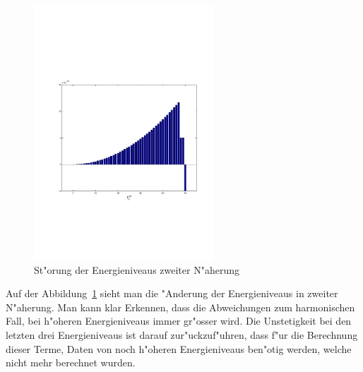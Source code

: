 \begin{refsection}
\begin{figure}	%
\centering
\includegraphics[width=0.6\textwidth]{anharmonisch/images/x3/EK2.pdf}
\caption{St"orung der Energieniveaus zweiter N"aherung
\label{skript:x3_EK2}}
\end{figure}

Auf der Abbildung~\ref{skript:x3_EK2} sieht man die "Anderung der Energieniveaus in zweiter N"aherung. Man kann klar Erkennen, dass die Abweichungen zum harmonischen Fall, bei h"oheren Energieniveaus immer gr"osser wird. Die Unstetigkeit bei den letzten drei Energieniveaus ist darauf zur"uckzuf"uhren, dass f"ur die Berechnung dieser Terme, Daten von noch h"oheren Energieniveaus ben"otig werden, welche nicht mehr berechnet wurden.


\end{refsection}

